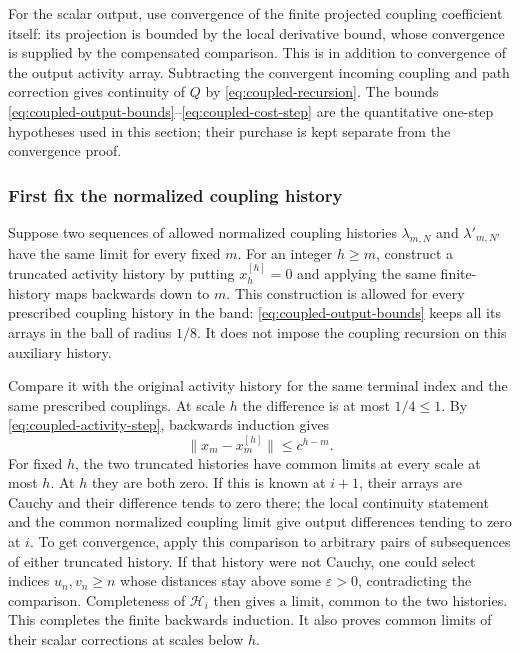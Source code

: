 For the scalar output, use convergence of the finite projected
coupling coefficient itself: its projection is bounded by the
local derivative bound, whose convergence is supplied by the
compensated comparison. This is in addition to convergence of
the output activity array. Subtracting the convergent incoming
coupling and path correction gives continuity of $Q$ by
\eqref{eq:coupled-recursion}.
The bounds \eqref{eq:coupled-output-bounds}--\eqref{eq:coupled-cost-step}
are the quantitative one-step hypotheses used in this section;
their purchase is kept separate from the convergence proof.

\subsubsection{First fix the normalized coupling history}
Suppose two sequences of allowed normalized coupling histories
$\lambda_{m,N}$ and $\lambda'_{m,N'}$ have the same limit for
every fixed $m$. For an integer $h\ge m$, construct a truncated
activity history by putting $x_h^{[h]}=0$ and applying the same
finite-history maps backwards down to $m$. This construction is
allowed for every prescribed coupling history in the band:
\eqref{eq:coupled-output-bounds} keeps all its arrays in the ball
of radius $1/8$. It does not impose the coupling recursion on this
auxiliary history.

Compare it with the original activity history for the same
terminal index and the same prescribed couplings. At scale $h$
the difference is at most $1/4\le1$. By
\eqref{eq:coupled-activity-step}, backwards induction gives
\begin{equation}\label{eq:coupled-truncation}
                         \|x_m-x_m^{[h]}\|\le c^{h-m}.
\end{equation}
For fixed $h$, the two truncated histories have common limits
at every scale at most $h$. At $h$ they are both zero. If this
is known at $i+1$, their arrays are Cauchy and their difference
tends to zero there; the local continuity statement and the
common normalized coupling limit give output differences tending
to zero at $i$. To get convergence, apply this comparison to
arbitrary pairs of subsequences of either truncated history.
If that history were not Cauchy, one could select indices
$u_n,v_n\ge n$ whose distances stay above some $\varepsilon>0$,
contradicting the comparison. Completeness of $\mathcal H_i$
then gives a limit, common to the two histories. This completes
the finite backwards induction. It also proves common limits
of their scalar corrections at scales below $h$.


